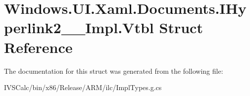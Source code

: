 \hypertarget{struct_windows_1_1_u_i_1_1_xaml_1_1_documents_1_1_i_hyperlink2_____impl_1_1_vtbl}{}\section{Windows.\+U\+I.\+Xaml.\+Documents.\+I\+Hyperlink2\+\_\+\+\_\+\+Impl.\+Vtbl Struct Reference}
\label{struct_windows_1_1_u_i_1_1_xaml_1_1_documents_1_1_i_hyperlink2_____impl_1_1_vtbl}


The documentation for this struct was generated from the following file\+:\begin{DoxyCompactItemize}
\item 
I\+V\+S\+Calc/bin/x86/\+Release/\+A\+R\+M/ilc/Impl\+Types.\+g.\+cs\end{DoxyCompactItemize}
